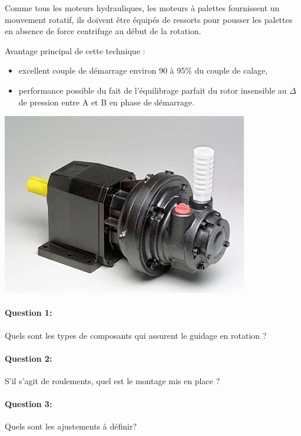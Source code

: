 \begin{minipage}{0.45\linewidth}

Comme tous les moteurs hydrauliques, les moteurs à palettes fournissent un mouvement rotatif, ils doivent être équipés de ressorts pour pousser les palettes en absence de force centrifuge au début de la rotation.

Avantage principal de cette technique :
\begin{itemize}
 \item excellent couple de démarrage environ 90 à 95\% du couple de calage,
 \item performance possible du fait de l'équilibrage parfait du rotor insensible au $\Delta$ de pression entre A et B en phase de démarrage.
\end{itemize}

\end{minipage}
\hfill
\begin{minipage}{0.45\linewidth}
 \centering\includegraphics[width=0.8\linewidth]{img/moteur_a_palettes.jpg}
\end{minipage}

\paragraph{Question 1:} Quels sont les types de composants qui assurent le guidage en rotation ?

\paragraph{Question 2:} S'il s'agit de roulements, quel est le montage mis en place ?

\paragraph{Question 3:} Quels sont les ajustements à définir?

